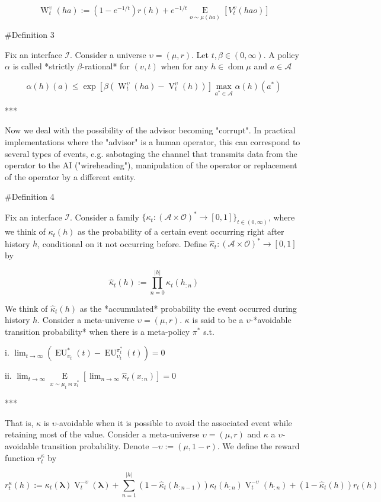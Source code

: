 \documentclass[a4paper]{article}
\DeclareMathOperator{\Dom}{dom}
\newcommand{\E}[1]{\underset{#1}{\operatorname{E}}}
\newcommand{\Estr}{\boldsymbol{\lambda}}
\newcommand{\Abs}[1]{\lvert #1 \rvert}
\newcommand{\Ob}{\mathcal{O}}
\newcommand{\A}{\mathcal{A}}
\newcommand{\I}{\mathcal{I}}
\newcommand{\FH}{(\A \times \Ob)^*}
\newcommand{\V}{\operatorname{V}}
\newcommand{\W}{\operatorname{W}}
\newcommand{\EU}{\operatorname{EU}}
\begin{document}
$$\W_t^\upsilon(ha):=(1-e^{-1/t})r(h)+e^{-1/t}\E{o \sim \mu(ha)}[V_t^\upsilon(hao)]$$

\#Definition 3

Fix an interface $\I$. Consider a universe $\upsilon=(\mu,r)$. Let $t,\beta \in (0,\infty)$. A policy $\alpha$ is called *strictly $\beta$-rational* for $(\upsilon,t)$ when for any $h \in \Dom{\mu}$ and $a \in \A$

$$\alpha(h)(a) \leq \exp{[\beta(\W^{\upsilon}_t(ha)-\V^\upsilon_t(h))]} \max_{a^* \in \A} \alpha(h)(a^*)$$

***

Now we deal with the possibility of the advisor becoming "corrupt". In practical implementations where the "advisor" is a human operator, this can correspond to several types of events, e.g. sabotaging the channel that transmits data from the operator to the AI ("wireheading"), manipulation of the operator or replacement of the operator by a different entity.

\#Definition 4

Fix an interface $\I$. Consider a family $\{\kappa_t: \FH \rightarrow [0,1]\}_{t \in (0,\infty)}$, where we think of $\kappa_t(h)$ as the probability of a certain event occurring right after history $h$, conditional on it not occurring before. Define $\hat{\kappa}_t: \FH \rightarrow [0,1]$ by

$$\hat{\kappa}_t(h):= \prod_{n = 0}^{\Abs{h}} \kappa_t(h_{:n})$$

We think of $\hat{\kappa}_t(h)$ as the *accumulated* probability the event occurred during history $h$. Consider a meta-universe $\upsilon=(\mu,r)$. $\kappa$ is said to be a $\upsilon$-*avoidable transition probability* when there is a meta-policy $\pi^*$ s.t.

i. $\lim_{t \rightarrow \infty} {(\EU_{\upsilon_t}^{*}(t)-\EU_{\upsilon_t}^{\pi^*_t}(t))} = 0$

ii. $\lim_{t \rightarrow \infty} \E{x \sim \mu_t\bowtie\pi^*_t}[\lim_{n \rightarrow \infty} \hat{\kappa}_t(x_{:n})] = 0$

***

That is, $\kappa$ is $\upsilon$-avoidable when it is possible to avoid the associated event while retaining most of the value. Consider a meta-universe $\upsilon=(\mu,r)$ and $\kappa$ a $\upsilon$-avoidable transition probability. Denote $-\upsilon:=(\mu,1-r)$. We define the reward function $r^\kappa_t$ by

$$r^\kappa_t(h):=\kappa_t(\Estr) \V^{-\upsilon}_t(\Estr)+\sum_{n=1}^{\Abs{h}} (1-\hat{\kappa}_t(h_{:n-1}))\kappa_t(h_{:n}) \V^{-\upsilon}_t(h_{:n})+(1-\hat{\kappa}_t(h))r_t(h)$$
\end{document}
